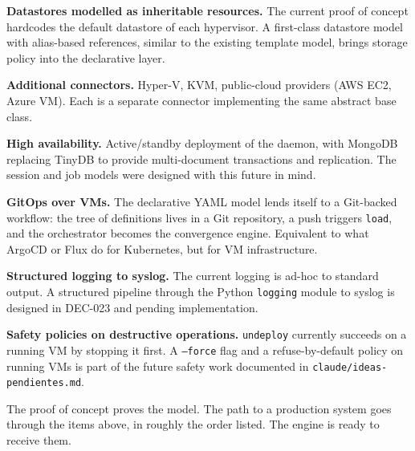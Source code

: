 \textbf{Datastores modelled as inheritable resources.} The current
proof of concept hardcodes the default datastore of each
hypervisor. A first-class datastore model with alias-based
references, similar to the existing template model, brings storage
policy into the declarative layer.

\textbf{Additional connectors.} Hyper-V, KVM, public-cloud
providers (AWS EC2, Azure VM). Each is a separate connector
implementing the same abstract base class.

\textbf{High availability.} Active/standby deployment of the
daemon, with MongoDB replacing TinyDB to provide multi-document
transactions and replication. The session and job models were
designed with this future in mind.

\textbf{GitOps over VMs.} The declarative YAML model lends itself
to a Git-backed workflow: the tree of definitions lives in a Git
repository, a push triggers \texttt{load}, and the orchestrator
becomes the convergence engine. Equivalent to what ArgoCD or Flux
do for Kubernetes, but for VM infrastructure.

\textbf{Structured logging to syslog.} The current logging is
ad-hoc to standard output. A structured pipeline through the
Python \texttt{logging} module to syslog is designed in DEC-023
and pending implementation.

\textbf{Safety policies on destructive operations.}
\texttt{undeploy} currently succeeds on a running VM by stopping
it first. A \texttt{--force} flag and a refuse-by-default policy
on running VMs is part of the future safety work documented in
\texttt{claude/ideas-pendientes.md}.


The proof of concept proves the model. The path to a production
system goes through the items above, in roughly the order listed.
The engine is ready to receive them.

